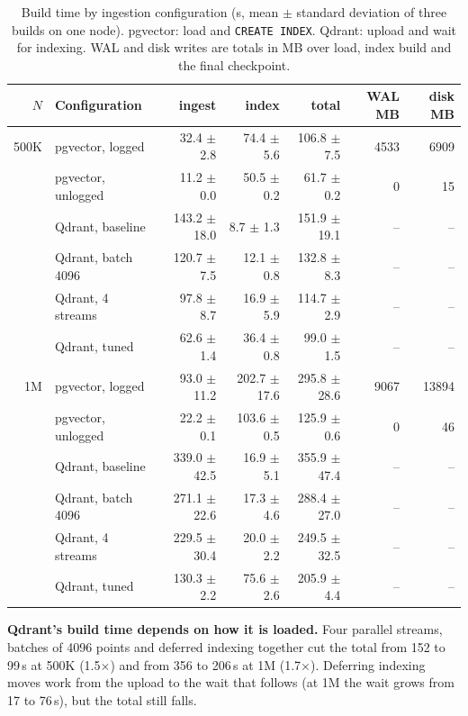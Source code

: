 \documentclass[preprint,12pt]{elsarticle}
\begin{document}
\begin{table}[t]
  \caption{Build time by ingestion configuration (s, mean $\pm$ standard deviation of three
  builds on one node). pgvector: load and \texttt{CREATE INDEX}. Qdrant: upload and wait for
  indexing. WAL and disk writes are totals in MB over load, index build and the final
  checkpoint.}
  \label{tab:ingest}
  \small
  \begin{tabular}{rl|rrr|rr}
    \toprule
    $N$ & Configuration & ingest & index & total & WAL MB & disk MB \\
    \midrule
    500K & pgvector, logged & 32.4 $\pm$ 2.8 & 74.4 $\pm$ 5.6 & 106.8 $\pm$ 7.5 & 4533 & 6909 \\
     & pgvector, unlogged & 11.2 $\pm$ 0.0 & 50.5 $\pm$ 0.2 & 61.7 $\pm$ 0.2 & 0 & 15 \\
     & Qdrant, baseline & 143.2 $\pm$ 18.0 & 8.7 $\pm$ 1.3 & 151.9 $\pm$ 19.1 & -- & -- \\
     & Qdrant, batch 4096 & 120.7 $\pm$ 7.5 & 12.1 $\pm$ 0.8 & 132.8 $\pm$ 8.3 & -- & -- \\
     & Qdrant, 4 streams & 97.8 $\pm$ 8.7 & 16.9 $\pm$ 5.9 & 114.7 $\pm$ 2.9 & -- & -- \\
     & Qdrant, tuned & 62.6 $\pm$ 1.4 & 36.4 $\pm$ 0.8 & 99.0 $\pm$ 1.5 & -- & -- \\
    \midrule
    1M & pgvector, logged & 93.0 $\pm$ 11.2 & 202.7 $\pm$ 17.6 & 295.8 $\pm$ 28.6 & 9067 & 13894 \\
     & pgvector, unlogged & 22.2 $\pm$ 0.1 & 103.6 $\pm$ 0.5 & 125.9 $\pm$ 0.6 & 0 & 46 \\
     & Qdrant, baseline & 339.0 $\pm$ 42.5 & 16.9 $\pm$ 5.1 & 355.9 $\pm$ 47.4 & -- & -- \\
     & Qdrant, batch 4096 & 271.1 $\pm$ 22.6 & 17.3 $\pm$ 4.6 & 288.4 $\pm$ 27.0 & -- & -- \\
     & Qdrant, 4 streams & 229.5 $\pm$ 30.4 & 20.0 $\pm$ 2.2 & 249.5 $\pm$ 32.5 & -- & -- \\
     & Qdrant, tuned & 130.3 $\pm$ 2.2 & 75.6 $\pm$ 2.6 & 205.9 $\pm$ 4.4 & -- & -- \\
    \bottomrule
  \end{tabular}
\end{table}

\textbf{Qdrant's build time depends on how it is loaded.} Four parallel streams, batches of
4096 points and deferred indexing together cut the total from 152 to 99\,s at 500K
(1.5$\times$) and from 356 to 206\,s at 1M (1.7$\times$). Deferring indexing moves work from
the upload to the wait that follows (at 1M the wait grows from 17 to 76\,s), but the total
still falls.
\end{document}
